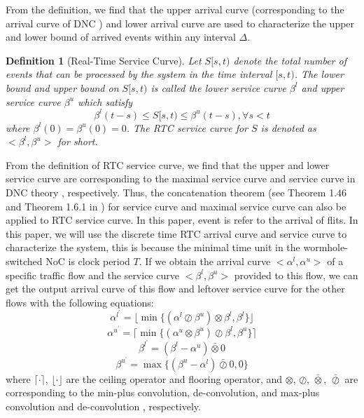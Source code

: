 \documentclass[10pt,journal]{IEEEtran}
\newtheorem{definition}{Definition}
\begin{document}
From the definition, we find that the upper arrival curve (corresponding to the arrival curve of DNC \cite{Boudec2001Network}) and lower arrival curve are used to characterize the upper and lower bound of arrived events within any interval $\Delta$.

\begin{definition}[Real-Time Service Curve]
Let $S[s,t)$ denote the total number of events that can be processed by the system in the time interval $[s,t)$. The lower bound and upper bound on $S[s,t)$ is called the lower service curve $\beta^l$ and upper service curve $\beta^u$ which satisfy
$$\beta^l(t-s)\leq S[s,t)\leq \beta^u(t-s),\forall s<t$$
where $\beta^l(0)=\beta^u(0)=0$. The RTC service curve for $S$ is denoted as $<\beta^l,\beta^u>$ for short.
\end{definition}

From the definition of RTC service curve, we find that the upper and lower service curve are corresponding to the maximal service curve and service curve in DNC theory \cite{Boudec2001Network}, respectively. Thus, the concatenation theorem (see Theorem 1.46 and Theorem 1.6.1 in \cite{Boudec2001Network}) for service curve and maximal service curve can also be applied to RTC service curve. In this paper, event is refer to the arrival of flits. In this paper, we will use the discrete time RTC arrival curve and service curve to characterize the system, this is because the minimal time unit in the wormhole-switched NoC is clock period $T$. If we obtain the arrival curve $<\alpha^l,\alpha^u>$ of a specific traffic flow and the service curve $<\beta^l,\beta^u>$ provided to this flow, we can get the output arrival curve of this flow and leftover service curve for the other flows with the following equations:
\begin{equation}\label{alphal}
\alpha^{l^\prime}=\lfloor\min\{(\alpha^l\oslash\beta^u)\otimes\beta^l,\beta^l\}\rfloor
\end{equation}
\begin{equation}\label{alphau}
\alpha^{u^\prime}=\lceil\min\{(\alpha^u\otimes\beta^u)\oslash\beta^l,\beta^u\}\rceil
\end{equation}
\begin{equation}\label{betal}
\beta^{l^\prime}=(\beta^l-\alpha^u)\bar{\otimes}0
\end{equation}
\begin{equation}\label{betau}
\beta^{u^\prime}=\max\{(\beta^u-\alpha^l)\bar{\oslash}0,0\}
\end{equation}
where $\lceil\cdot\rceil$, $\lfloor\cdot\rfloor$ are the ceiling operator and flooring operator, and $\otimes$, $\oslash$, $\bar{\otimes}$, $\bar{\oslash}$ are corresponding to the min-plus convolution, de-convolution, and max-plus convolution and de-convolution \cite{Boudec2001Network}, respectively.
\end{document}
